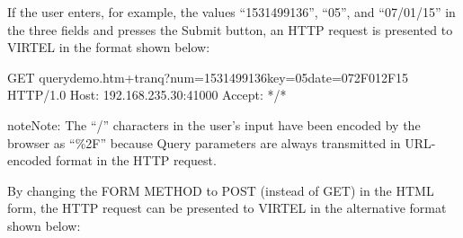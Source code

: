 \documentclass[letterpaper,10pt,english]{sphinxmanual}
\begin{document}

If the user enters, for example, the values “1531499136”, “05”, and “07/01/15” in the three fields and presses the Submit button, an HTTP request is presented to VIRTEL in the format shown below:

\begin{sphinxVerbatim}[commandchars=\\\{\}]
GET querydemo.htm+tranq?num=1531499136\PYGZam{}key=05\PYGZam{}date=07\PYGZpc{}2F01\PYGZpc{}2F15 HTTP/1.0
Host: 192.168.235.30:41000
Accept: */*
\end{sphinxVerbatim}


\begin{sphinxadmonition}{note}{Note:}
The “/” characters in the user’s input have been encoded by the browser as “\%2F” because Query parameters are always transmitted in URL-encoded format in the HTTP request.
\end{sphinxadmonition}


By changing the FORM METHOD to POST (instead of GET) in the HTML form, the HTTP request can be presented to VIRTEL in the alternative format shown below:

\begin{sphinxVerbatim}[commandchars=\\\{\}]
  
 
 
 
 
\end{sphinxVerbatim}

\end{document}
